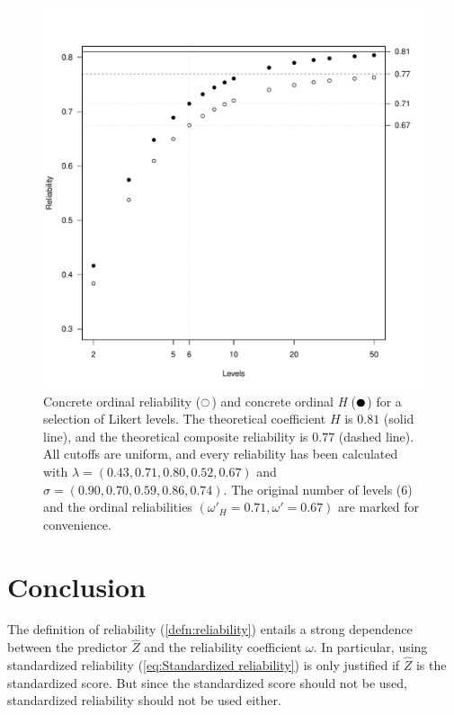 \documentclass[twoside]{article}
\begin{document}
\begin{figure}
\noindent \begin{centering}
\includegraphics[scale=0.5]{chunks/ordinals}
\par\end{centering}
\caption{\label{fig:Ordinal reliability}Concrete ordinal reliability ($\fullmoon$)
and concrete ordinal \textit{H} ($\newmoon$) for a selection of Likert levels. The
theoretical coefficient $H$ is $0.81$ (solid line), and the theoretical
composite reliability is $0.77$ (dashed line). All cutoffs are uniform,
and every reliability has been calculated with $\lambda=(0.43,0.71,0.80,0.52,0.67)$
and $\sigma=(0.90,0.70,0.59,0.86,0.74)$. The original number of levels
($6$) and the ordinal reliabilities $(\omega'_{H}=0.71,\omega'=0.67)$
are marked for convenience.}
\end{figure}

\section{Conclusion}
The definition of reliability (\cref{defn:reliability}) entails a strong dependence between the predictor $\hat{Z}$ and the reliability coefficient $\omega$. In particular, using standardized reliability (\cref{eq:Standardized reliability}) is only justified if $\hat{Z}$ is the standardized score. But since the standardized score should not be used, standardized reliability should not be used either.
\end{document}
